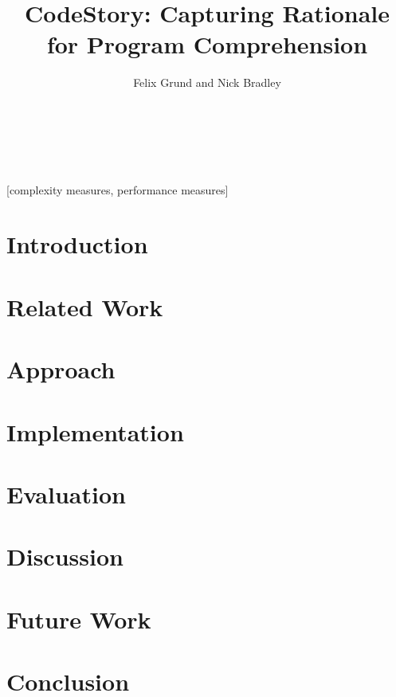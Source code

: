 \documentclass{sig-alternate}
\begin{document}
\title{CodeStory: Capturing Rationale for Program Comprehension}

\author{
\alignauthor
Felix Grund and Nick Bradley \\
       \\
       \\
       \\
}
\maketitle

\begin{abstract}
  
\end{abstract}

[complexity measures, performance measures]



\section{Introduction}
  \label{sec:introduction}
  
\section{Related Work}
  \label{sec:related-work}
  
\section{Approach}
  \label{sec:approach}
  
\section{Implementation}
  \label{sec:implementation}
  
\section{Evaluation}
  \label{sec:evaluation}
  
\section{Discussion}
  \label{sec:discussion}
  
\section{Future Work}
  \label{sec:future-work}
  
\section{Conclusion}
  \label{sec:conclusion}
  

  
  
\end{document}
